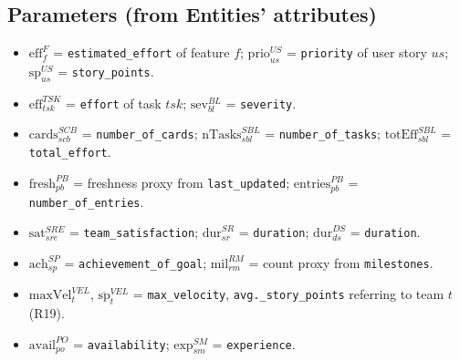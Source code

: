 \documentclass[11pt,a4paper]{article}
\begin{document}
\subsection*{Parameters (from Entities' attributes)}
\begin{itemize}[leftmargin=2em]
  \item $\text{eff}^{F}_f$ = \texttt{estimated\_effort} of feature $f$; $\text{prio}^{US}_{us}$ = \texttt{priority} of user story $us$; $\text{sp}^{US}_{us}$ = \texttt{story\_points}.
  \item $\text{eff}^{TSK}_{tsk}$ = \texttt{effort} of task $tsk$; $\text{sev}^{BL}_{bl}$ = \texttt{severity}.
  \item $\text{cards}^{SCB}_{scb}$ = \texttt{number\_of\_cards}; $\text{nTasks}^{SBL}_{sbl}$ = \texttt{number\_of\_tasks}; $\text{totEff}^{SBL}_{sbl}$ = \texttt{total\_effort}.
  \item $\text{fresh}^{PB}_{pb}$ = freshness proxy from \texttt{last\_updated}; $\text{entries}^{PB}_{pb}$ = \texttt{number\_of\_entries}.
  \item $\text{sat}^{SRE}_{sre}$ = \texttt{team\_satisfaction}; $\text{dur}^{SR}_{sr}$ = \texttt{duration}; $\text{dur}^{DS}_{ds}$ = \texttt{duration}.
  \item $\text{ach}^{SP}_{sp}$ = \texttt{achievement\_of\_goal}; $\text{mil}^{RM}_{rm}$ = count proxy from \texttt{milestones}.
  \item $\text{maxVel}^{VEL}_{t}$, $\overline{\text{sp}}^{VEL}_{t}$ = \texttt{max\_velocity}, \texttt{avg.\_story\_points} referring to team $t$ (R19).
  \item $\text{avail}^{PO}_{po}$ = \texttt{availability}; $\text{exp}^{SM}_{sm}$ = \texttt{experience}.
\end{itemize}
\end{document}
